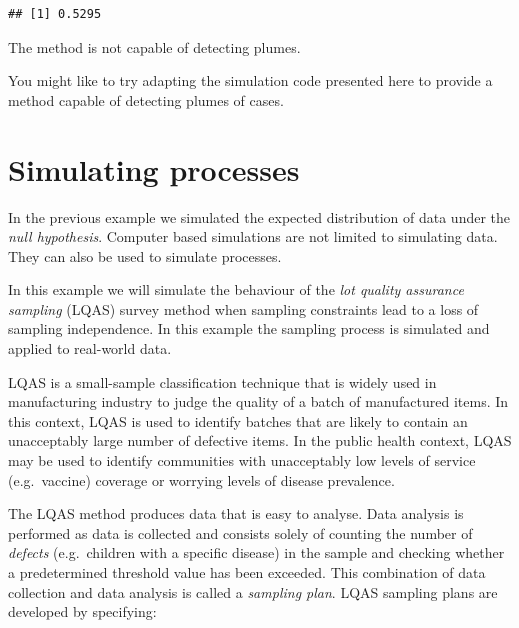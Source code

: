 \documentclass[12pt,a4paper]{book}
\theoremstyle{definition}
\theoremstyle{definition}
\theoremstyle{definition}
\theoremstyle{remark}
\begin{document}
\begin{verbatim}
## [1] 0.5295
\end{verbatim}

The method is not capable of detecting plumes.

You might like to try adapting the simulation code presented here to
provide a method capable of detecting plumes of cases.

\hypertarget{simulating-processes}{%
\section{Simulating processes}\label{simulating-processes}}

In the previous example we simulated the expected distribution of data
under the \emph{null hypothesis}. Computer based simulations are not
limited to simulating data. They can also be used to simulate processes.

In this example we will simulate the behaviour of the \emph{lot quality
assurance sampling} (LQAS) survey method when sampling constraints lead
to a loss of sampling independence. In this example the sampling process
is simulated and applied to real-world data.

LQAS is a small-sample classification technique that is widely used in
manufacturing industry to judge the quality of a batch of manufactured
items. In this context, LQAS is used to identify batches that are likely
to contain an unacceptably large number of defective items. In the
public health context, LQAS may be used to identify communities with
unacceptably low levels of service (e.g.~vaccine) coverage or worrying
levels of disease prevalence.

The LQAS method produces data that is easy to analyse. Data analysis is
performed as data is collected and consists solely of counting the
number of \emph{defects} (e.g.~children with a specific disease) in the
sample and checking whether a predetermined threshold value has been
exceeded. This combination of data collection and data analysis is
called a \emph{sampling plan}. LQAS sampling plans are developed by
specifying:
\end{document}
